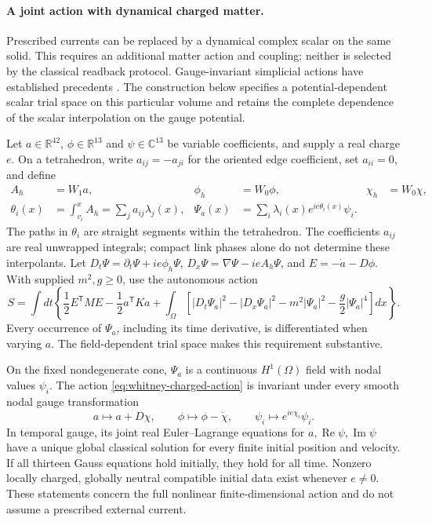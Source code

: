 \paragraph{A joint action with dynamical charged matter.}
Prescribed currents can be replaced by a dynamical complex scalar on the
same solid. This requires an additional matter action and coupling;
neither is selected by the classical readback protocol. Gauge-invariant
simplicial actions have established precedents
\cite{ChristiansenHalvorsen2012}. The construction below specifies a
potential-dependent scalar trial space on this particular volume and retains the
complete dependence of the scalar interpolation on the gauge potential.

Let \(a\in\mathbb R^{42}\), \(\phi\in\mathbb R^{13}\) and
\(\psi\in\mathbb C^{13}\) be variable coefficients, and supply a
real charge \(e\). On a tetrahedron, write \(a_{ij}=-a_{ji}\) for
the oriented edge coefficient, set \(a_{ii}=0\), and define
\begin{align*}
 A_h&=W_1a,& \phi_h&=W_0\phi,& \chi_h&=W_0\chi,\\
 \theta_i(x)&=\int_{v_i}^{x}A_h
             =\sum_j a_{ij}\lambda_j(x),&
 \Psi_a(x)&=\sum_i\lambda_i(x)e^{ie\theta_i(x)}\psi_i.
\end{align*}
The paths in \(\theta_i\) are straight segments within the tetrahedron.
The coefficients \(a_{ij}\) are real unwrapped integrals; compact link
phases alone do not determine these interpolants.
Let \(D_t\Psi=\partial_t\Psi+ie\phi_h\Psi\),
\(D_x\Psi=\nabla\Psi-ieA_h\Psi\), and
\(E=-\dot a-D\phi\). With supplied \(m^2,g\geq0\), use the
autonomous action
\begin{equation}
 S=\int dt\left\{\frac12E^{\mathsf T}ME-\frac12a^{\mathsf T}Ka
 +\int_\Omega\left[
 |D_t\Psi_a|^2-|D_x\Psi_a|^2-m^2|\Psi_a|^2
                  -\frac g2|\Psi_a|^4\right]dx\right\}.
 \label{eq:whitney-charged-action}
\end{equation}
Every occurrence of \(\Psi_a\), including its time derivative, is
differentiated when varying \(a\). The field-dependent trial space makes
this requirement substantive.

\begin{theorem}
\label{thm:whitney-charged-matter}
On the fixed nondegenerate cone, \(\Psi_a\) is a continuous
\(H^1(\Omega)\) field with nodal values \(\psi_i\). The action
\eqref{eq:whitney-charged-action} is invariant under every smooth nodal
gauge transformation
\[
 a\longmapsto a+D\chi,\qquad
 \phi\longmapsto\phi-\dot\chi,\qquad
 \psi_i\longmapsto e^{ie\chi_i}\psi_i.
\]
In temporal gauge, its joint real Euler--Lagrange equations for
\(a,\operatorname{Re}\psi,\operatorname{Im}\psi\) have a unique
global classical solution for every finite initial position and velocity.
If all thirteen Gauss equations hold initially, they hold for all time.
Nonzero locally charged, globally neutral compatible initial data exist
whenever \(e\ne0\). These statements concern the full nonlinear
finite-dimensional action and do not assume a prescribed external current.
\end{theorem}

